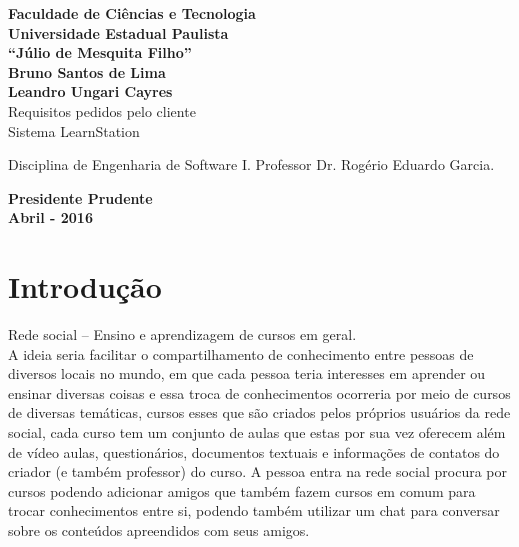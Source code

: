 \documentclass[12pt,a4paper,onecolumn,titlepage]{article}
\begin{document}

\begin{titlepage} %
	
	\vfill
	\begin{center}
	
		{\large \textbf{Faculdade de Ciências e Tecnologia\\Universidade Estadual Paulista\\``Júlio de Mesquita Filho''}} \\[3cm]
		{\large \textbf{Bruno Santos de Lima}}\\
		{\large \textbf{Leandro Ungari Cayres}}\\[4cm]
		{\Large Requisitos pedidos pelo cliente}\\
		{\Large Sistema LearnStation}\\[4cm]

	\hspace{.45\textwidth} %
	\begin{minipage}{.5\textwidth}
		\large Disciplina de Engenharia de Software I. Professor Dr. Rogério Eduardo Garcia.\\[0.5cm]
	\end{minipage}

	\vfill
	\vspace{1.5cm}
	
	\large \textbf{Presidente Prudente\\}
	\large \textbf{Abril - 2016}
	
	\end{center}
	
\end{titlepage}


\section{Introdução}
\label{sect:intro}

Rede social – Ensino e aprendizagem de cursos em geral.\\

A ideia seria facilitar o compartilhamento de conhecimento entre pessoas de diversos locais no mundo, em que cada pessoa teria interesses em aprender ou ensinar diversas coisas e essa troca de conhecimentos ocorreria por meio de cursos de diversas temáticas, cursos esses que são criados pelos próprios usuários da rede social, cada curso tem um conjunto de aulas que estas por sua vez oferecem além de vídeo aulas, questionários, documentos textuais e informações de contatos do criador (e também professor) do curso. A pessoa entra na rede social procura por cursos podendo adicionar amigos que também fazem cursos em comum para trocar conhecimentos entre si, podendo também utilizar um chat para conversar sobre os conteúdos apreendidos com seus amigos.
\end{document}

